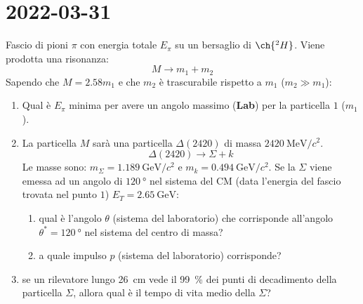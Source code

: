 \chapter{2022-03-31}
\begin{example}[]
	Fascio di pioni $\pi$ con energia totale $E _{\pi}$ su un bersaglio di
	$\ch{^{2}H}$. Viene prodotta una risonanza:
	\begin{equation}
		M \rightarrow m_1 + m_2
	\end{equation}
	Sapendo che $M = 2.58 m_1$ e che $m_2$ è trascurabile rispetto a $m_1$ ($m_2
		\gg m_1$):
	\begin{enumerate}
		\item Qual è $E _{\pi}$ minima per avere un angolo massimo (\textbf{Lab})
		      per la particella $1$ ($m_1$).
		\item La particella $M$ sarà una particella $\Delta (2420)$ di massa
		      $\qty{2420}{\MeV \per c^2}$.
		      \begin{equation}
			      \Delta (2420) \rightarrow \Sigma + k
		      \end{equation}
		      Le masse sono: $m _{\Sigma} = \qty{1.189}{\GeV \per c^2}$ e $m _{k} =
			      \qty{0.494}{\GeV \per c^2}$.
		      Se la $\Sigma$ viene emessa ad un angolo di $\qty{120}{\degree}$ nel
		      sistema del CM (data l'energia del fascio trovata nel punto $1$) $E
				      _{T} = \qty{2.65}{\GeV}$:
		      \begin{enumerate}
			      \item qual è l'angolo $\theta$ (sistema del laboratorio) che
			            corrisponde all'angolo $\theta^\ast = \qty{120}{\degree}$ nel
			            sistema del centro di massa?
			      \item a quale impulso $p$ (sistema del laboratorio) corrisponde?
		      \end{enumerate}
		\item se un rilevatore lungo \qty{26}{\cm} vede il \qty{99}{\%} dei punti
		      di decadimento della particella $\Sigma$, allora qual è il tempo di
		      vita medio della $\Sigma$?
	\end{enumerate}


\end{example}
